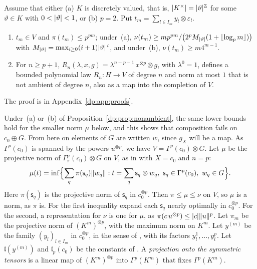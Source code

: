 \begin{proposition}\label{dp:prop:nonambient}
Assume that either (a) $K$ is discretely valued, that is, $\lvert K^\times\rvert=\lvert \vartheta\rvert^{\mathbb Z}$ for some $\vartheta\in K$ with $0<\lvert \vartheta\rvert<1$, or (b) $p=2$. Put $t_m=\sum_{l\in I_m}y_l\otimes\varepsilon_l$.
\begin{enumerate}
\item $t_m\in V$ and $\pi(t_m)\le p^{pm}$; under~(a), $\nu(t_m)\ge mp^{pm}/\bigl(2^pM_{\lvert \vartheta\rvert}(1+\lfloor\log_pm\rfloor)\bigr)$ with $M_{\lvert \vartheta\rvert}=\max_{i\ge0}(i+1)\lvert \vartheta\rvert^{\,i}$, and under~(b), $\nu(t_m)\ge m4^{m-1}$.
\item For $n\ge p+1$, $R_n(\lambda,x,g)=\lambda^{n-p-1}\,x^{\otimes p}\otimes g$, with $\lambda^0=1$, defines a bounded polynomial law $R_n\colon H\to V$ of degree $n$ and norm at most $1$ that is not ambient of degree $n$, also as a map into the completion of $V$.
\end{enumerate}
\end{proposition}
The proof is in Appendix~\ref{dp:app:proofs}.

Under~(a) or~(b) of Proposition~\ref{dp:prop:nonambient}, the same lower bounds hold for the smaller norm $\mu$ below, and this shows that composition fails on $c_0\oplus G$. From here on elements of $G$ are written $w$, since $g_X$ will be a map. As $\Gamma^p(c_0)$ is spanned by the powers $u^{\otimes p}$, we have $V=\Gamma^p(c_0)\otimes G$. Let $\mu$ be the projective norm of $\Gamma^p_\pi(c_0)\otimes G$ on $V$, as in \cite[(14.4)]{I} with $X=c_0$ and $n=p$:
\[
 \mu(t)=\inf\Bigl\{\sum_q\pi(\mathsf s_q)\lVert w_q\rVert:t=\sum_q\mathsf s_q\otimes w_q,\ \mathsf s_q\in\Gamma^p(c_0),\ w_q\in G\Bigr\}.
\]
Here $\pi(\mathsf s_q)$ is the projective norm of $\mathsf s_q$ in $c_0^{\otimes p}$. Then $\pi\le\mu\le\nu$ on $V$, so $\mu$ is a norm, as $\pi$ is. For the first inequality expand each $\mathsf s_q$ nearly optimally in $c_0^{\otimes p}$. For the second, a representation for $\nu$ is one for $\mu$, as $\pi(c\,u^{\otimes p})\le\lvert c\rvert\lVert u\rVert^p$. Let $\pi_m$ be the projective norm of $(K^m)^{\otimes p}$, with the maximum norm on $K^m$. Let $y^{(m)}$ be the family $(y_l)_{l\in I_m}$ in $c_0^{\otimes p}$, in the sense of \cite[Definition~14.15]{I}, with its factors $y_l^1,\dots,y_l^p$. Let $\mathfrak l(y^{(m)})$ and $\mathfrak l_p(c_0)$ be the constants of \cite[(14.3)]{I}. A \emph{projection onto the symmetric tensors} is a linear map of $(K^m)^{\otimes p}$ into $\Gamma^p(K^m)$ that fixes $\Gamma^p(K^m)$.

